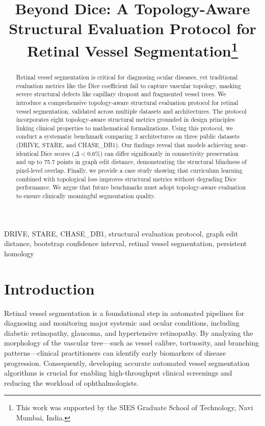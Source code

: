 \documentclass[conference]{IEEEtran}
\begin{document}
\title{Beyond Dice: A Topology-Aware Structural Evaluation Protocol for Retinal Vessel Segmentation\thanks{This work was supported by the SIES Graduate School of Technology, Navi Mumbai, India.}}

\author{
}

\maketitle

\begin{abstract}
Retinal vessel segmentation is critical for diagnosing ocular diseases, yet traditional evaluation metrics like the Dice coefficient fail to capture vascular topology, masking severe structural defects like capillary dropout and fragmented vessel trees. We introduce a comprehensive topology-aware structural evaluation protocol for retinal vessel segmentation, validated across multiple datasets and architectures. The protocol incorporates eight topology-aware structural metrics grounded in design principles linking clinical properties to mathematical formalizations. Using this protocol, we conduct a systematic benchmark comparing 3 architectures on three public datasets (DRIVE, STARE, and CHASE\_DB1). Our findings reveal that models achieving near-identical Dice scores ($\Delta < 0.6\%$) can differ significantly in connectivity preservation and up to 75.7 points in graph edit distance, demonstrating the structural blindness of pixel-level overlap. Finally, we provide a case study showing that curriculum learning combined with topological loss improves structural metrics without degrading Dice performance. We argue that future benchmarks must adopt topology-aware evaluation to ensure clinically meaningful segmentation quality.
\end{abstract}

\begin{IEEEkeywords}
DRIVE, STARE, CHASE\_DB1, structural evaluation protocol, graph edit distance, bootstrap confidence interval, retinal vessel segmentation, persistent homology
\end{IEEEkeywords}

\section{Introduction}
Retinal vessel segmentation is a foundational step in automated pipelines for diagnosing and monitoring major systemic and ocular conditions, including diabetic retinopathy, glaucoma, and hypertensive retinopathy. By analyzing the morphology of the vascular tree—such as vessel calibre, tortuosity, and branching patterns—clinical practitioners can identify early biomarkers of disease progression. Consequently, developing accurate automated vessel segmentation algorithms is crucial for enabling high-throughput clinical screenings and reducing the workload of ophthalmologists.
\end{document}
